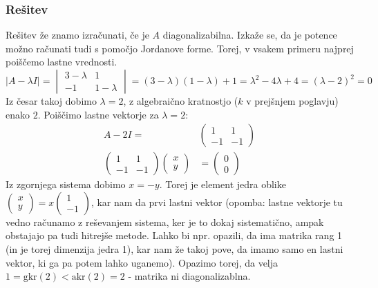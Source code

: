 \documentclass{article}
\begin{document}
\subsubsection*{Rešitev}
Rešitev že znamo izračunati, če je $A$ diagonalizabilna. Izkaže se, da je potence možno računati tudi s pomočjo Jordanove forme. Torej, v vsakem primeru najprej poiščemo lastne vrednosti.
\begin{equation*}
|A-\lambda I | =
\begin{vmatrix}
3-\lambda & 1 \\
-1  & 1-\lambda
\end{vmatrix} = (3-\lambda)(1-\lambda)+1 = \lambda^2 -4 \lambda + 4 = (\lambda-2)^2 = 0
\end{equation*}
Iz česar takoj dobimo $\lambda=2$, z algebraično kratnostjo ($k$ v prejšnjem poglavju) enako $2$.
Poiščimo lastne vektorje za $\lambda = 2$:
\begin{align*}
A-2I  =&
\begin{pmatrix}
1 & 1 \\
-1  & -1
\end{pmatrix} \\
\begin{pmatrix}
1 & 1 \\
-1  & -1
\end{pmatrix} 
\begin{pmatrix}
x \\ y \end{pmatrix} &= \begin{pmatrix} 0 \\ 0 \end{pmatrix}
\end{align*}
Iz zgornjega sistema dobimo $x=-y$. Torej je element jedra oblike $\begin{pmatrix} x \\ y \end{pmatrix} = x \begin{pmatrix} 1 \\ -1 \end{pmatrix}$, kar nam da prvi lastni vektor (opomba: lastne vektorje tu vedno računamo z reševanjem sistema, ker je to dokaj sistematično, ampak obstajajo pa tudi hitrejše metode. Lahko bi npr. opazili, da ima matrika rang 1 (in je torej dimenzija jedra 1), kar nam že takoj pove, da imamo samo en lastni vektor, ki ga pa potem lahko uganemo). Opazimo torej, da velja $1 =\mathrm{gkr}(2) < \mathrm{akr}(2) = 2$ - matrika ni diagonalizablna. 
\end{document}
